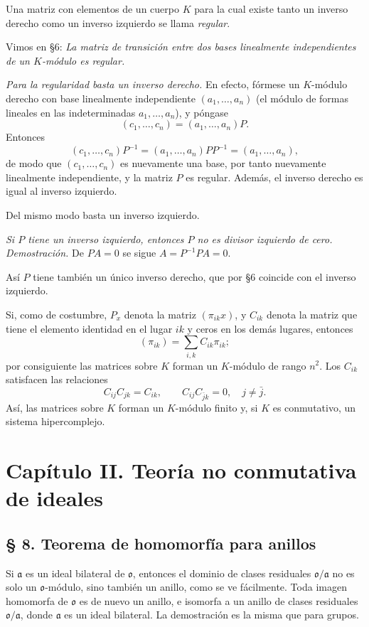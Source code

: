 \documentclass[11pt]{article}
\providecommand{\mo}{\mathfrak{o}}
\providecommand{\ma}{\mathfrak{a}}
\begin{document}
Una matriz con elementos de un cuerpo $K$ para la cual existe tanto un inverso derecho como un inverso izquierdo se llama \emph{regular}.

Vimos en §6: \emph{La matriz de transición entre dos bases linealmente independientes de un $K$-módulo es regular.}

\emph{Para la regularidad basta un inverso derecho.} En efecto, fórmese un $K$-módulo derecho con base linealmente independiente $(a_1,\ldots,a_n)$ (el módulo de formas lineales en las indeterminadas $a_1,\ldots,a_n$), y póngase
\[
        (c_1,\ldots,c_n)=(a_1,\ldots,a_n)P.
\]
Entonces
\[
        (c_1,\ldots,c_n)P^{-1}=(a_1,\ldots,a_n)PP^{-1}=(a_1,\ldots,a_n),
\]
de modo que $(c_1,\ldots,c_n)$ es nuevamente una base, por tanto nuevamente linealmente independiente, y la matriz $P$ es regular. Además, el inverso derecho es igual al inverso izquierdo.

Del mismo modo basta un inverso izquierdo.

\emph{Si $P$ tiene un inverso izquierdo, entonces $P$ no es divisor izquierdo de cero.}
\emph{Demostración.} De $PA=0$ se sigue $A=P^{-1}PA=0$.

Así $P$ tiene también un único inverso derecho, que por §6 coincide con el inverso izquierdo.

Si, como de costumbre, $P_x$ denota la matriz $(\pi_{ik}x)$, y $C_{ik}$ denota la matriz que tiene el elemento identidad en el lugar $ik$ y ceros en los demás lugares, entonces
\[
        (\pi_{ik})=\sum_{i,k} C_{ik}\pi_{ik};
\]
por consiguiente las matrices sobre $K$ forman un $K$-módulo de rango $n^2$. Los $C_{ik}$ satisfacen las relaciones
\[
        C_{ij}C_{jk}=C_{ik},
        \qquad
        C_{ij}C_{\bar j k}=0,\quad j\ne\bar j.
\]
Así, las matrices sobre $K$ forman un $K$-módulo finito y, si $K$ es conmutativo, un sistema hipercomplejo.

\section*{Capítulo II. Teoría no conmutativa de ideales}

\subsection*{§ 8. Teorema de homomorfía para anillos}

Si $\ma$ es un ideal bilateral de $\mo$, entonces el dominio de clases residuales $\mo/\ma$ no es solo un $\mo$-módulo, sino también un anillo, como se ve fácilmente. Toda imagen homomorfa de $\mo$ es de nuevo un anillo, e isomorfa a un anillo de clases residuales $\mo/\ma$, donde $\ma$ es un ideal bilateral. La demostración es la misma que para grupos.
\end{document}
